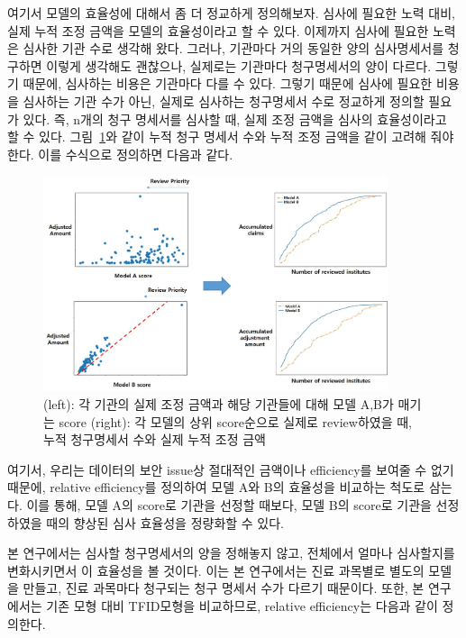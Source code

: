 \documentclass[11pt]{article}           %
\begin{document}
여기서 모델의 효율성에 대해서 좀 더 정교하게 정의해보자.
심사에 필요한 노력 대비, 실제 누적 조정 금액을 모델의 효율성이라고 할 수 있다.
이제까지 심사에 필요한 노력은 심사한 기관 수로 생각해 왔다.
그러나, 기관마다 거의 동일한 양의 심사명세서를 청구하면 이렇게 생각해도 괜찮으나, 실제로는 기관마다 청구명세서의 양이 다르다.
그렇기 때문에, 심사하는 비용은 기관마다 다를 수 있다.
그렇기 때문에 심사에 필요한 비용을 심사하는 기관 수가 아닌, 실제로 심사하는 청구명세서 수로 정교하게 정의할 필요가 있다.
즉, n개의 청구 명세서를 심사할 때, 실제 조정 금액을 심사의 효율성이라고 할 수 있다.
그림~\ref{fig:relative efficiency2}와 같이 누적 청구 명세서 수와 누적 조정 금액을 같이 고려해 줘야 한다.
이를 수식으로 정의하면 다음과 같다.

\begin{figure}[h]
   \centering
   \vspace{0.5cm}
   \includegraphics[width=0.9\textwidth]{[figure6]relative_efficiency2.jpg}
   \vspace{-0.5cm}
   \caption{(left): 각 기관의 실제 조정 금액과 해당 기관들에 대해 모델 A,B가 매기는 score (right): 각 모델의 상위 score순으로 실제로 review하였을 때, 누적 청구명세서 수와 실제 누적 조정 금액}
   \vspace{0.5cm}
   \label{fig:relative efficiency2}
\end{figure}

여기서, 우리는 데이터의 보안 issue상 절대적인 금액이나 efficiency를 보여줄 수 없기 때문에, relative efficiency를 정의하여 모델 A와 B의 효율성을 비교하는 척도로 삼는다.
이를 통해, 모델 A의 score로 기관을 선정할 때보다, 모델 B의 score로 기관을 선정하였을 때의 향상된 심사 효율성을 정량화할 수 있다.

본 연구에서는 심사할 청구명세서의 양을 정해놓지 않고, 전체에서 얼마나 심사할지를 변화시키면서 이 효율성을 볼 것이다.
이는 본 연구에서는 진료 과목별로 별도의 모델을 만들고, 진료 과목마다 청구되는 청구 명세서 수가 다르기 때문이다.
또한, 본 연구에서는 기존 모형 대비 TFID모형을 비교하므로, relative efficiency는 다음과 같이 정의한다.
\end{document}
